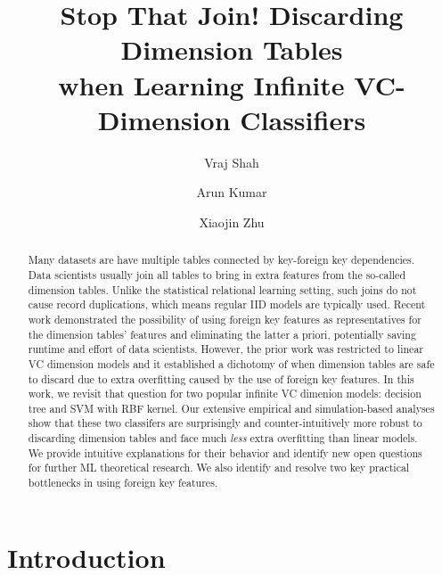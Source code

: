 \documentclass[sigconf]{acmart}
\begin{document}
\title{Stop That Join! Discarding Dimension Tables \\when Learning Infinite VC-Dimension Classifiers}

\author{Vraj Shah}
\author{Arun Kumar}
\author{Xiaojin Zhu}

\begin{abstract}
Many datasets are have multiple tables connected by key-foreign key dependencies.
Data scientists usually join all tables to bring in extra features from the so-called 
dimension tables. Unlike the statistical relational learning setting, such joins do 
not cause record duplications, which means regular IID models are typically used. Recent
work demonstrated the possibility of using foreign key features as representatives for the 
dimension tables' features and eliminating the latter a priori, potentially saving runtime
and effort of data scientists. However, the prior work was restricted to linear VC dimension 
models and it established a dichotomy of when dimension tables are safe to discard due to extra
overfitting caused by the use of foreign key features. In this work, we revisit that question 
for two popular infinite VC dimenion models: decision tree and SVM with RBF kernel. Our 
extensive empirical and simulation-based analyses show that these two classifers are surprisingly and 
counter-intuitively more robust to discarding dimension tables and face much \textit{less} extra overfitting 
than linear models. We provide intuitive explanations for their behavior and identify new open 
questions for further ML theoretical research. We also identify and resolve two key practical 
bottlenecks in using foreign key features.
\end{abstract}


\maketitle

\section{Introduction}
\end{document}
